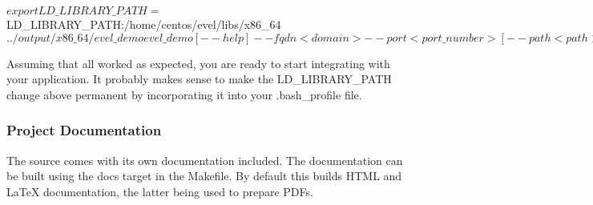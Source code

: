 \begin{DoxyCode}
$ export LD\_LIBRARY\_PATH=$LD\_LIBRARY\_PATH:/home/centos/evel/libs/x86\_64
$ ../output/x86\_64/evel\_demo
evel\_demo [--help]
          --fqdn <domain>
          --port <port\_number>
          [--path <path>]
          [--topic <topic>]
          [--username <username>]
          [--password <password>]
          [--https]
          [--cycles <cycles>]
          [--nothrott]

Demonstrate use of the ECOMP Vendor Event Listener API.

  -h         Display this usage message.
  --help

  -f         The FQDN or IP address to the RESTful API.
  --fqdn

  -n         The port number the RESTful API.
  --port

  -p         The optional path prefix to the RESTful API.
  --path

  -t         The optional topic part of the RESTful API.
  --topic

  -u         The optional username for basic authentication of requests.
  --username

  -w         The optional password for basic authentication of requests.
  --password

  -s         Use HTTPS rather than HTTP for the transport.
  --https

  -c         Loop <cycles> times round the main loop.  Default = 1.
  --cycles

  -v         Generate much chattier logs.
  --verbose

  -x         Exclude throttling commands from demonstration.
  --nothrott

$
\end{DoxyCode}
 Assuming that all worked as expected, you are ready to start integrating with your application. It probably makes sense to make the L\+D\+\_\+\+L\+I\+B\+R\+A\+R\+Y\+\_\+\+P\+A\+TH change above permanent by incorporating it into your {\ttfamily .bash\+\_\+profile} file.\hypertarget{quickstart_qs_build_docs}{}\subsubsection{Project Documentation}\label{quickstart_qs_build_docs}
The source comes with its own documentation included. The documentation can be built using the {\ttfamily docs} target in the Makefile. By default this builds H\+T\+ML and La\+TeX documentation, the latter being used to prepare P\+D\+Fs.

